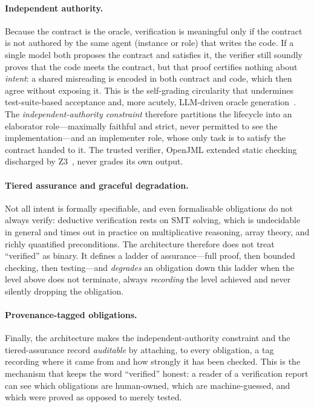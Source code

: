\paragraph{Independent authority.} Because the contract is the oracle, verification is meaningful only if the contract is not authored by the same agent (instance or role) that writes the code. If a single model both proposes the contract and satisfies it, the verifier still soundly proves that the code meets the contract, but that proof certifies nothing about \emph{intent}: a shared misreading is encoded in both contract and code, which then agree without exposing it. This is the self-grading circularity that undermines test-suite-based acceptance and, more acutely, LLM-driven oracle generation~\cite{liu2026oracle}. The \emph{independent-authority constraint} therefore partitions the lifecycle into an elaborator role---maximally faithful and strict, never permitted to see the implementation---and an implementer role, whose only task is to satisfy the contract handed to it. The trusted verifier, OpenJML extended static checking discharged by Z3~\cite{cok2014openjml,demoura2008z3}, never grades its own output.

\paragraph{Tiered assurance and graceful degradation.} Not all intent is formally specifiable, and even formalisable obligations do not always verify: deductive verification rests on SMT solving, which is undecidable in general and times out in practice on multiplicative reasoning, array theory, and richly quantified preconditions. The architecture therefore does not treat ``verified'' as binary. It defines a ladder of assurance---full proof, then bounded checking, then testing---and \emph{degrades} an obligation down this ladder when the level above does not terminate, always \emph{recording} the level achieved and never silently dropping the obligation.

\paragraph{Provenance-tagged obligations.} Finally, the architecture makes the independent-authority constraint and the tiered-assurance record \emph{auditable} by attaching, to every obligation, a tag recording where it came from and how strongly it has been checked. This is the mechanism that keeps the word ``verified'' honest: a reader of a verification report can see which obligations are human-owned, which are machine-guessed, and which were proved as opposed to merely tested.

